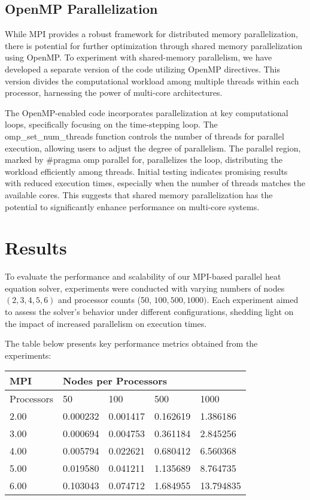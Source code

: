 \documentclass[10pt]{article}
\begin{document}
\subsection{OpenMP Parallelization}
While MPI provides a robust framework for distributed memory parallelization, there is potential for further optimization through shared memory parallelization using OpenMP. To experiment with shared-memory parallelism, we have developed a separate version of the code utilizing OpenMP directives. This version divides the computational workload among multiple threads within each processor, harnessing the power of multi-core architectures.

The OpenMP-enabled code incorporates parallelization at key computational loops, specifically focusing on the time-stepping loop. The omp\_set\_num\_threads function controls the number of threads for parallel execution, allowing users to adjust the degree of parallelism. The parallel region, marked by \#pragma omp parallel for, parallelizes the loop, distributing the workload efficiently among threads. Initial testing indicates promising results with reduced execution times, especially when the number of threads matches the available cores. This suggests that shared memory parallelization has the potential to significantly enhance performance on multi-core systems.

\section{Results}
To evaluate the performance and scalability of our MPI-based parallel heat equation solver, experiments were conducted with varying numbers of nodes $(2,3,4,5,6)$ and processor counts (50, $100,500,1000)$. Each experiment aimed to assess the solver's behavior under different configurations, shedding light on the impact of increased parallelism on execution times.

The table below presents key performance metrics obtained from the experiments:

\begin{center}
\begin{tabular}{|l|l|l|l|l|}
\hline
MPI & \multicolumn{4}{l|}{Nodes per Processors} \\
\hline
Processors & 50 & 100 & 500 & 1000 \\
\hline
2.00 & 0.000232 & 0.001417 & 0.162619 & 1.386186 \\
\hline
3.00 & 0.000694 & 0.004753 & 0.361184 & 2.845256 \\
\hline
4.00 & 0.005794 & 0.022621 & 0.680412 & 6.560368 \\
\hline
5.00 & 0.019580 & 0.041211 & 1.135689 & 8.764735 \\
\hline
6.00 & 0.103043 & 0.074712 & 1.684955 & 13.794835 \\
\hline
\end{tabular}
\end{center}
\end{document}
